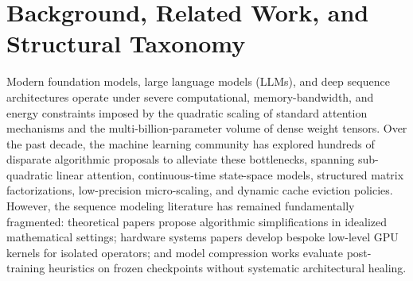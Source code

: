 
\section{Background, Related Work, and Structural Taxonomy}
\label{sec:related_taxonomy}

Modern foundation models, large language models (LLMs), and deep sequence architectures operate under severe computational, memory-bandwidth, and energy constraints imposed by the quadratic scaling of standard attention mechanisms and the multi-billion-parameter volume of dense weight tensors. Over the past decade, the machine learning community has explored hundreds of disparate algorithmic proposals to alleviate these bottlenecks, spanning sub-quadratic linear attention, continuous-time state-space models, structured matrix factorizations, low-precision micro-scaling, and dynamic cache eviction policies. However, the sequence modeling literature has remained fundamentally fragmented: theoretical papers propose algorithmic simplifications in idealized mathematical settings; hardware systems papers develop bespoke low-level GPU kernels for isolated operators; and model compression works evaluate post-training heuristics on frozen checkpoints without systematic architectural healing.

